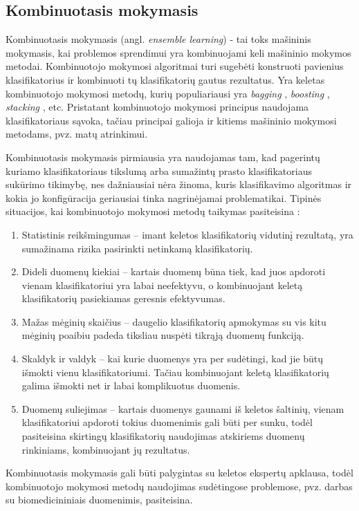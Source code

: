 

\subsection{Kombinuotasis mokymasis}

Kombinuotasis mokymasis (angl. \textit{ensemble learning}) - tai toks mašininis mokymasis, kai problemos sprendimui yra kombinuojami keli mašininio mokymos metodai. Kombinuotojo mokymosi algoritmai turi sugebėti konstruoti pavienius	  klasifikatorius ir kombinuoti tų klasifikatorių gautus rezultatus. Yra keletas kombinuotojo mokymosi metodų, kurių populiariausi yra \textit{bagging} \cite{breiman1996bagging}, \textit{boosting} \cite{schapire2003boosting}, \textit{stacking} \cite{wolpert1992stacked}, etc. Pristatant kombinuotojo mokymosi principus naudojama klasifikatoriaus sąvoka, tačiau principai galioja ir kitiems mašininio mokymosi metodams, pvz. matų atrinkimui. 

Kombinuotasis mokymasis pirmiausia yra naudojamas tam, kad pagerintų kuriamo klasifikatoriaus tikslumą arba sumažintų prasto klasifikatoriaus sukūrimo tikimybę, nes dažniausiai nėra žinoma, kuris klasifikavimo algoritmas ir kokia jo konfigūracija geriausiai tinka nagrinėjamai problematikai. Tipinės situacijos, kai kombinuotojo mokymosi metodų taikymas pasiteisina \cite{polikar2006ensemble}:
\begin{enumerate}
 \item Statistinis reikšmingumas -- imant keletos klasifikatorių vidutinį rezultatą, yra sumažinama rizika pasirinkti netinkamą klasifikatorių.
 \item Dideli duomenų kiekiai -- kartais duomenų būna tiek, kad juos apdoroti vienam klasifikatoriui yra labai neefektyvu, o kombinuojant keletą klasifikatorių pasiekiamas geresnis efektyvumas.
 \item Mažas mėginių skaičius -- daugelio klasifikatorių apmokymas su vis kitu mėginių poaibiu padeda tiksliau nuspėti tikrąją duomenų funkciją.
 \item Skaldyk ir valdyk -- kai kurie duomenys yra per sudėtingi, kad jie būtų išmokti vienu klasifikatoriumi. Tačiau kombinuojant keletą klasifikatorių galima išmokti net ir labai komplikuotus duomenis. 
 \item Duomenų suliejimas -- kartais duomenys gaunami iš keletos šaltinių, vienam klasifikatoriui apdoroti tokius duomenimis gali būti per sunku, todėl pasiteisina skirtingų klasifikatorių naudojimas atskiriems duomenų rinkiniams, kombinuojant jų rezultatus.
\end{enumerate}
Kombinuotasis mokymasis gali būti palygintas su keletos ekspertų apklausa, todėl kombinuotojo mokymosi metodų naudojimas sudėtingose problemose, pvz. darbas su biomedicininiais duomenimis, pasiteisina.

